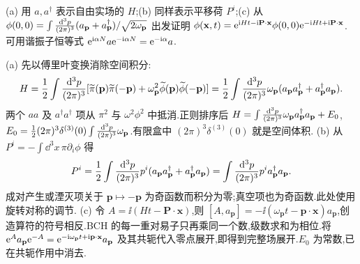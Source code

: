 \begin{exercise}
(a) 用 $a,a^\dagger$ 表示自由实场的 $H$;(b) 同样表示平移荷 $P^i$;(c) 从
$\phi(0,0)=\int\frac{\mathrm d^3p}{(2\pi)^3}(a_{\mathbf p}+a^\dagger_{\mathbf p})/\sqrt{2\omega_{\mathbf p}}$ 出发证明
$\phi(\mathbf x,t)=\mathrm e^{\mathrm i Ht-\mathrm i\mathbf P\cdot\mathbf x}\phi(0,0)\mathrm e^{-\mathrm i Ht+\mathrm i\mathbf P\cdot\mathbf x}$.
可用谐振子恒等式 $\mathrm e^{\mathrm i\alpha N}a\mathrm e^{-\mathrm i\alpha N}=\mathrm e^{-\mathrm i\alpha}a$.
\end{exercise}
\begin{solution}
(a) 先以傅里叶变换消除空间积分:
\[
H=\frac12\int\frac{\mathrm d^3p}{(2\pi)^3}[\widetilde\pi(\mathbf p)\widetilde\pi(-\mathbf p)+\omega_{\mathbf p}^2\widetilde\phi(\mathbf p)\widetilde\phi(-\mathbf p)]
=\frac12\int\frac{\mathrm d^3p}{(2\pi)^3}\omega_{\mathbf p}(a_{\mathbf p}a^\dagger_{\mathbf p}+a^\dagger_{\mathbf p}a_{\mathbf p}).
\]
两个 $aa$ 及 $a^\dagger a^\dagger$ 项从 $\pi^2$ 与 $\omega^2\phi^2$ 中抵消.正则排序后
$H=\int\frac{\mathrm d^3p}{(2\pi)^3}\omega_{\mathbf p}a^\dagger_{\mathbf p}a_{\mathbf p}+E_0$,
$E_0=\tfrac12(2\pi)^3\delta^{(3)}(0)\int\frac{\mathrm d^3p}{(2\pi)^3}\omega_{\mathbf p}$.有限盒中 $(2\pi)^3\delta^{(3)}(0)$ 就是空间体积.
(b) 从 $P^i=-\int\dd^3x\,\pi\partial_i\phi$ 得
\[
P^i=\frac12\int\frac{\mathrm d^3p}{(2\pi)^3} p^i(a_{\mathbf p}a^\dagger_{\mathbf p}+a^\dagger_{\mathbf p}a_{\mathbf p})
=\int\frac{\mathrm d^3p}{(2\pi)^3} p^ia^\dagger_{\mathbf p}a_{\mathbf p}.
\]
成对产生或湮灭项关于 $\mathbf p\mapsto-\mathbf p$ 为奇函数而积分为零;真空项也为奇函数.此处使用旋转对称的调节.
(c) 令 $A=\ii(Ht-\mathbf P\cdot\mathbf x)$,则
$[A,a_{\mathbf p}]=-\ii(\omega_{\mathbf p}t-\mathbf p\cdot\mathbf x)a_{\mathbf p}$,创造算符的符号相反.BCH 的每一重对易子只再乘同一个数,级数求和为相位.将
$\mathrm e^Aa_{\mathbf p}\mathrm e^{-A}=\mathrm e^{-\mathrm i\omega_{\mathbf p}t+\mathrm i\mathbf p\cdot\mathbf x}a_{\mathbf p}$ 及其共轭代入零点展开,即得到完整场展开.$E_0$ 为常数,已在共轭作用中消去.
\end{solution}

